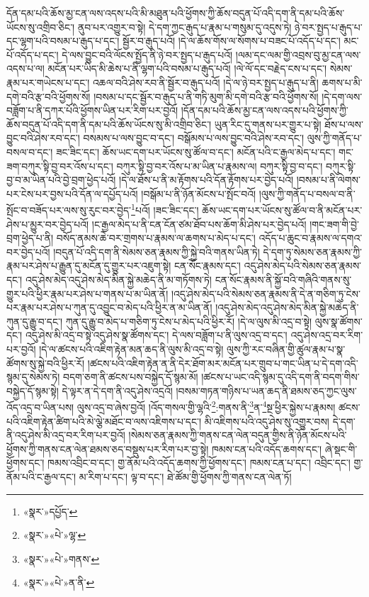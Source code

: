 དོན་དམ་པའི་ཆོས་མྱ་ངན་ལས་འདས་པའི་མི་མཐུན་པའི་ཕྱོགས་ཀྱི་ཆོས་བདུན་པོ་འདི་དག་ནི་དམ་པའི་ཆོས་ཡོངས་སུ་འགྲིབ་ཅིང་། ནུབ་པར་འགྱུར་བ་སྟེ། དེ་དག་ཀྱང་རྒུད་པ་རྣམ་པ་གསུམ་དུ་འདུས་ཏེ། ཉེ་བར་སྤྱད་པ་རྒུད་པ་དང་ལྷག་པའི་བསམ་པ་རྒུད་པ་དང་། སྦྱོར་བ་རྒུད་པའོ། །དེ་ལ་ཆོས་གོས་ལ་སོགས་པ་བཟང་པོ་འདོད་པ་དང་། མང་པོ་འདོད་པ་དང་། དེ་ལས་བྱུང་བའི་ལོངས་སྤྱོད་ནི་ཉེ་བར་སྤྱད་པ་རྒུད་པའོ། །ལམ་དང་ལམ་གྱི་འབྲས་བུ་མྱ་ངན་ལས་འདས་པ་ལ། མངོན་པར་ཡིད་མི་ཆེས་པ་ནི་ལྷག་པའི་བསམ་པ་རྒུད་པའོ། །ལེ་ལོ་དང་བརྗེད་ངས་པ་དང་། སེམས་རྣམ་པར་གཡེངས་པ་དང་། འཆལ་བའི་ཤེས་རབ་ནི་སྦྱོར་བ་རྒུད་པའོ། །དེ་ལ་ཉེ་བར་སྤྱད་པ་རྒུད་པ་ནི། ཆགས་པ་མི་དགེ་བའི་རྩ་བའི་ཕྱོགས་སོ། །བསམ་པ་དང་སྦྱོར་བ་རྒུད་པ་ནི་གཏི་མུག་མི་དགེ་བའི་རྩ་བའི་ཕྱོགས་སོ། །དེ་དག་ལས་བཟློག་པ་ནི་དཀར་པོའི་ཕྱོགས་ཡིན་པར་རིག་པར་བྱའོ། །དོན་དམ་པའི་ཆོས་མྱ་ངན་ལས་འདས་པའི་ཕྱོགས་ཀྱི་ཆོས་བདུན་པོ་འདི་དག་ནི་དམ་པའི་ཆོས་ཡོངས་སུ་མི་འགྲིབ་ཅིང་། ཡུན་རིང་དུ་གནས་པར་གྱུར་པ་སྟེ། ཐོས་པ་ལས་བྱུང་བའི་ཤེས་རབ་དང་། བསམས་པ་ལས་བྱུང་བ་དང་། བསྒོམས་པ་ལས་བྱུང་བའི་ཤེས་རབ་དང་། ལུས་ཀྱི་གནོད་པ་བསལ་བ་དང་། ཟང་ཟིང་དང་། ཆོས་ཡང་དག་པར་ཡོངས་སུ་ཚོལ་བ་དང་། མངོན་པའི་ང་རྒྱལ་མེད་པ་དང་། གང་ཟག་བཀུར་སྟི་བྱ་བར་འོས་པ་དང་། བཀུར་སྟི་བྱ་བར་འོས་པ་མ་ཡིན་པ་རྣམས་ལ། བཀུར་སྟི་བྱ་བ་དང་། བཀུར་སྟི་བྱ་བ་མ་ཡིན་པའི་བྱེ་བྲག་ཕྱེད་པའོ། །དེ་ལ་ཐོས་པ་ནི་མ་རྟོགས་པའི་དོན་རྟོགས་པར་བྱེད་པའོ། །བསམ་པ་ནི་ལེགས་པར་ངེས་པར་བྱས་པའི་དོན་ལ་དཔྱོད་པའོ། །བསྒོམ་པ་ནི་ཉོན་མོངས་པ་སྤོང་བའོ། །ལུས་ཀྱི་གནོད་པ་བསལ་བ་ནི་སྤོང་བ་བཟོད་པར་ལས་སུ་རུང་བར་བྱེད་\footnote{«སྣར་»དཔྱོད་}པའོ། །ཟང་ཟིང་དང་། ཆོས་ཡང་དག་པར་ཡོངས་སུ་ཚོལ་བ་ནི་མངོན་པར་ཤེས་པ་མྱུར་བར་བྱེད་པའོ། །ང་རྒྱལ་མེད་པ་ནི་ངན་ངོན་ཙམ་ཐོབ་པས་ཆོག་མི་ཤེས་པར་བྱེད་པའོ། །གང་ཟག་གི་བྱེ་བྲག་ཕྱེད་པ་ནི། བསོད་ནམས་ཆེ་བར་གྲགས་པ་རྣམས་ལ་ཆགས་པ་མེད་པ་དང་། འདོད་པ་ཆུང་བ་རྣམས་ལ་དགའ་བར་བྱེད་པའོ། །བདུན་པོ་འདི་དག་ནི་སེམས་ཅན་རྣམས་ཀྱི་སྐྱེ་བའི་གནས་ཡིན་ཏེ། དེ་དག་ཏུ་སེམས་ཅན་རྣམས་ཀྱི་རྣམ་པར་ཤེས་པ་རྒྱུན་དུ་མངོན་དུ་གྱུར་པར་འཇུག་སྟེ། ངན་སོང་རྣམས་དང་། འདུ་ཤེས་མེད་པའི་སེམས་ཅན་རྣམས་དང་། འདུ་ཤེས་མེད་འདུ་ཤེས་མེད་མིན་སྐྱེ་མཆེད་ནི་མ་གཏོགས་ཏེ། ངན་སོང་རྣམས་ནི་སྐྱོ་བའི་གཞིའི་གནས་སུ་གྱུར་པའི་ཕྱིར་རྣམ་པར་ཤེས་པ་གནས་པ་མ་ཡིན་ནོ། །འདུ་ཤེས་མེད་པའི་སེམས་ཅན་རྣམས་ནི་དེ་ན་གཅིག་ཏུ་ངེས་པར་རྣམ་པར་ཤེས་པ་ཀུན་དུ་འབྱུང་བ་མེད་པའི་ཕྱིར་ན་མ་ཡིན་ནོ། །འདུ་ཤེས་མེད་འདུ་ཤེས་མེད་མིན་སྐྱེ་མཆེད་ནི་ཀུན་དུ་རྒྱུ་བ་དང་། ཀུན་དུ་རྒྱུ་བ་མེད་པ་གཅིག་ཏུ་ངེས་པ་མེད་པའི་ཕྱིར་རོ། །དེ་ལ་ལུས་མི་འདྲ་བ་སྟེ། ལུས་སྣ་ཚོགས་དང་། འདུ་ཤེས་མི་འདྲ་བ་སྟེ་འདུ་ཤེས་སྣ་ཚོགས་དང་། དེ་ལས་བཟློག་པ་ནི་ལུས་འདྲ་བ་དང་། འདུ་ཤེས་འདྲ་བར་རིག་པར་བྱའོ། །དེ་ལ་ཚངས་པའི་འཇིག་རྟེན་མན་ཆད་ནི་ལུས་མི་འདྲ་བ་སྟེ། ལུས་ཀྱི་རང་བཞིན་གྱི་ཚུལ་རྣམ་པ་སྣ་ཚོགས་སུ་སྐྱེ་བའི་ཕྱིར་རོ། །ཚངས་པའི་འཇིག་རྟེན་ན་ནི་དེར་ཐོག་མར་མངོན་པར་གྲུབ་པ་གང་ཡིན་པ་དེ་དག་འདི་སྙམ་དུ་སེམས་ཏེ། བདག་ཅག་ནི་ཚངས་པས་བསྐྱེད་དོ་སྙམ་མོ། །ཚངས་པ་ཡང་འདི་སྙམ་དུ་འདི་དག་ནི་བདག་གིས་བསྐྱེད་དོ་སྙམ་སྟེ། དེ་ལྟར་ན་དེ་དག་ནི་འདུ་ཤེས་འདྲའོ། །བསམ་གཏན་གཉིས་པ་ཡན་ཆད་ནི་ཐམས་ཅད་ཀྱང་ལུས་འོད་འདྲ་བ་ཡིན་པས། ལུས་འདྲ་བ་ཞེས་བྱའོ། །འོད་གསལ་གྱི་ལྷའི་\footnote{«སྣར་»«པེ་»ལྷ་}:གནས་ནི་\footnote{«སྣར་»«པེ་»གནས་}ན་\footnote{«སྣར་»«པེ་»ན་ནི་}སྔ་ཕྱིར་སྐྱེས་པ་རྣམས། ཚངས་པའི་འཇིག་རྟེན་ཚིག་པའི་མེ་ལྕེ་མཐོང་བ་ལས་འཇིགས་པ་དང་། མི་འཇིགས་པའི་འདུ་ཤེས་སུ་འགྱུར་བས། དེ་དག་ནི་འདུ་ཤེས་མི་འདྲ་བར་རིག་པར་བྱའོ། །སེམས་ཅན་རྣམས་ཀྱི་གནས་ངན་ལེན་བདུན་གྱིས་ནི་ཉོན་མོངས་པའི་ཕྱོགས་ཀྱི་གནས་ངན་ལེན་ཐམས་ཅད་བསྡུས་པར་རིག་པར་བྱ་སྟེ། ཁམས་ངན་པའི་འདོད་ཆགས་དང་། ཞེ་སྡང་གི་ཕྱོགས་དང་། ཁམས་འབྲིང་བ་དང་། གྱ་ནོམ་པའི་འདོད་ཆགས་ཀྱི་ཕྱོགས་དང་། ཁམས་ངན་པ་དང་། འབྲིང་དང་། གྱ་ནོམ་པའི་ང་རྒྱལ་དང་། མ་རིག་པ་དང་། ལྟ་བ་དང་། ཐེ་ཚོམ་གྱི་ཕྱོགས་ཀྱི་གནས་ངན་ལེན་ཏོ། 